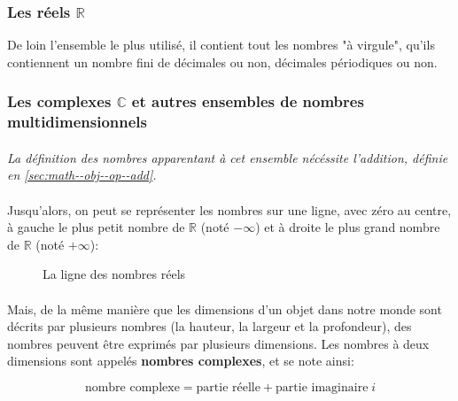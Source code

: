 \documentclass[a4paper]{book}
\begin{document}
    \subsubsection{Les réels $\mathds{R}$}
    De loin l'ensemble le plus utilisé, il contient tout les nombres "à virgule", qu'ils contiennent un nombre fini de décimales ou non, décimales périodiques ou non.
    
    \subsubsection{Les complexes $\mathds{C}$ et autres ensembles de nombres multidimensionnels}
    \paragraph{}
    \emph{La définition des nombres apparentant à cet ensemble nécéssite l'addition, définie en \ref{sec:math--obj--op--add}.}
    
    \paragraph{}
    Jusqu'alors, on peut se représenter les nombres sur une ligne, avec zéro au centre, à gauche le plus petit nombre de $\mathds{R}$ (noté $-\infty$) et à droite le plus grand nombre de $\mathds{R}$ (noté $+\infty$):
    
    \begin{figure}[h!]
        \centering
        \caption{La ligne des nombres réels}
        \label{fig:numberline}
    \end{figure}
    
    \paragraph{}
    Mais, de la même manière que les dimensions d'un objet dans notre monde sont décrits par plusieurs nombres (la hauteur, la largeur et la profondeur), des nombres peuvent être exprimés par plusieurs dimensions. Les nombres à deux dimensions sont appelés \textbf{nombres complexes}, et se note ainsi:
    
    $$\text{nombre complexe} = \text{partie réelle} + \text{partie imaginaire}\;i$$
    
\end{document}
